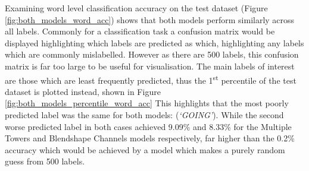 Examining word level classification accuracy on the test dataset (Figure \ref{fig:both_models_word_acc}) shows that both models perform similarly across all labels.
Commonly for a classification task a confusion matrix would be displayed highlighting which labels are predicted as which, highlighting any labels which are commonly mislabelled.
However as there are 500 labels, this confusion matrix is far too large to be useful for visualisation.
The main labels of interest are those which are least frequently predicted, thus the 1\textsuperscript{st} percentile of the test dataset is plotted instead, shown in Figure \ref{fig:both_models_percentile_word_acc} 
This highlights that the most poorly predicted label was the same for both models: (\textit{`GOING'}).
While the second worse predicted label in both cases achieved 9.09\% and 8.33\% for the Multiple Towers and Blendshape Channels models respectively, far higher than the 0.2\% accuracy which would be achieved by a model which makes a purely random guess from 500 labels.

